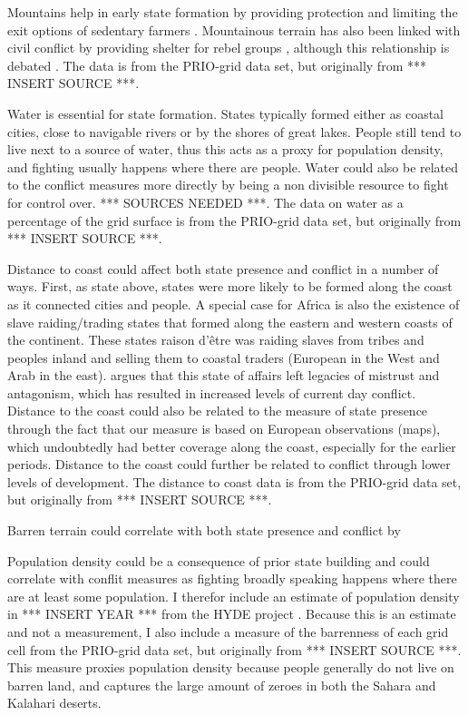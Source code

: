 \documentclass[12pt]{article}
\begin{document}
Mountains help in early state formation by providing protection and limiting the
exit options of sedentary farmers \citep{Carneiro1988}. Mountainous terrain has
also been linked with civil conflict by providing shelter for rebel groups
\citep{Hegre2006}, although this relationship is debated 
\citep{Buhaug2002}. The data is from the PRIO-grid data set, but originally 
from *** INSERT SOURCE ***.

Water is essential for state formation. States typically formed either as
coastal cities, close to navigable rivers or by the shores of great lakes.
People still tend to live next to a source of water, thus this acts as a proxy
for population density, and fighting usually happens where there are people.
Water could also be related to the conflict measures more directly by being a
non divisible resource to fight for control over. *** SOURCES NEEDED ***. The
data on water as a percentage of the grid surface is from the PRIO-grid data
set, but originally from *** INSERT SOURCE ***.

Distance to coast could affect both state presence and conflict in a number of
ways. First, as state above, states were more likely to be formed along the
coast as it connected cities and people. A special case for Africa is also the
existence of slave raiding/trading states that formed along the eastern and
western coasts of the continent. These states raison d'être was raiding slaves
from tribes and peoples inland and selling them to coastal traders (European in
the West and Arab in the east). \citet{Nunn2008} argues that this state of
affairs left legacies of mistrust and antagonism, which has resulted in
increased levels of current day conflict. Distance to the coast could also be
related to the measure of state presence through the fact that our measure is
based on European observations (maps), which undoubtedly had better coverage
along the coast, especially for the earlier periods. Distance to the coast could
further be related to conflict through lower levels of development. The distance
to coast data is from the PRIO-grid data set, but originally from *** INSERT
SOURCE ***.

Barren terrain could correlate with both state presence and conflict by 

Population density could be a consequence of prior state building and could
correlate with conflit measures as fighting broadly speaking happens where there
are at least some population. I therefor include an estimate of population
density in *** INSERT YEAR *** from the HYDE project \citep{Goldewijk2016}.
Because this is an estimate and not a measurement, I also include a measure of
the barrenness of each grid cell from the PRIO-grid data set, but originally
from *** INSERT SOURCE ***. This measure proxies population density because
people generally do not live on barren land, and captures the large amount of
zeroes in both the Sahara and Kalahari deserts.
\end{document}
